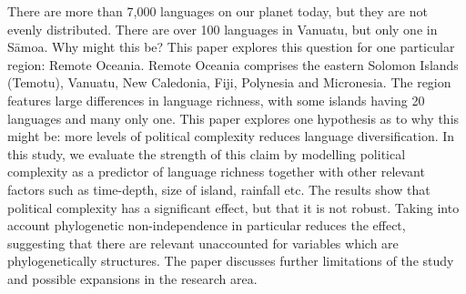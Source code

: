 There are more than 7,000 languages on our planet today, but they are not evenly distributed. There are over 100 languages in Vanuatu, but only one in S\={a}moa. Why might this be? This paper explores this question for one particular region: Remote Oceania. Remote Oceania comprises the eastern Solomon Islands (Temotu), Vanuatu, New Caledonia, Fiji, Polynesia and Micronesia. The region features large differences in language richness, with some islands having 20 languages and many only one. This paper explores one hypothesis as to why this might be: more levels of political complexity reduces language diversification. In this study, we evaluate the strength of this claim by modelling political complexity as a predictor of language richness together with other relevant factors such as time-depth, size of island, rainfall etc. The results show that political complexity has a significant effect, but that it is not robust. Taking into account phylogenetic non-independence in particular reduces the effect, suggesting that there are relevant unaccounted for variables which are phylogenetically structures. The paper discusses further limitations of the study and possible expansions in the research area. 